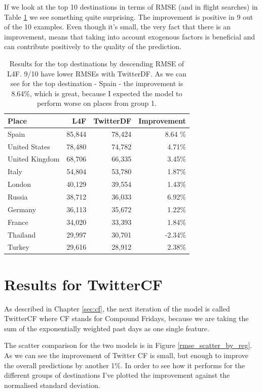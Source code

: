 \documentclass[minf,twoside,singlespacing,parskip,frontabs,notimes,11pt]{infthesis}
\begin{document}
If we look at the top 10 destinations in terms of RMSE (and in flight searches) in Table \ref{top10} we see something quite surprising.  The improvement is positive in 9 out of the 10 examples. Even though it's small, the very fact that there is an improvement, means that taking into account exogenous factors is beneficial and can contribute positively to the quality of the prediction.

\begin{table}[]
\begin{center}
\begin{tabular}{ l | r | r | r}
Place & L4F & TwitterDF & Improvement \\
\hline
Spain & 85,844 & 78,424 & 8.64 \% \\
United States & 78,480 & 74,782 & 4.71\% \\
United Kingdom & 68,706 & 66,335 & 3.45\% \\
Italy & 54,804 & 53,780 & 1.87\% \\
London & 40,129 & 39,554 & 1.43\% \\
Russia & 38,712 & 36,033 & 6.92\% \\
Germany & 36,113 & 35,672 & 1.22\% \\
France & 34,020 & 33,393 & 1.84\% \\
Thailand & 29,997 & 30,701 & -2.34\% \\
Turkey & 29,616 & 28,912 & 2.38\% 
\end{tabular}
\end{center}
\caption{Results for the top destinations by descending RMSE of L4F. 9/10 have lower RMSEs with TwitterDF. As we can see for the top destination - Spain - the improvement is 8.64\%, which is great, because I expected the model to perform worse on places from group 1.}
\label{top10}
\end{table}


\newpage
\section{Results for TwitterCF}
\label{TwitterCF}

As described in Chapter \ref{sec:cf}, the next iteration of the model is called TwitterCF where CF stands for Compound Fridays, because we are taking the sum of the exponentially weighted past days as one single feature. 

The scatter comparison for the two models is in Figure \ref{rmse_scatter_by_reg}. As we can see the improvement of Twitter CF is small, but enough to improve the overall predictions by another 1\%. In order to see how it performs for the different groups of destinations I've plotted the improvement against the normalised standard deviation.
\end{document}
